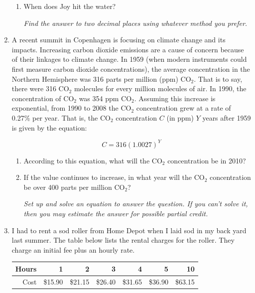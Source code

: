\documentclass[12pt]{article}
\begin{document}
\begin{enumerate}
\begin{enumerate}
\item When does Joy hit the water?

\emph{Find the answer to two decimal places using whatever method you prefer.}

\vfill
\end{enumerate}

\newpage %

\item A recent summit in Copenhagen is focusing on climate change and its impacts.  Increasing carbon dioxide emissions are a cause of concern because of their linkages to climate change.  In 1959 (when modern instruments could first measure carbon dioxide concentrations), the average concentration in the Northern Hemisphere was 316 parts per million (ppm) CO$_{2}$.  That is to say, there were 316 CO$_{2}$ molecules for every million molecules of air.  In 1990, the concentration of CO$_{2}$ was 354 ppm CO$_{2}$.  Assuming this increase is exponential, from 1990 to 2008 the CO$_{2}$ concentration grew at a rate of 0.27\% per year.  That is, the CO$_{2}$ concentration $C$ (in ppm) $Y$ years after 1959 is given by the equation:

$$C=316(1.0027)^Y$$

\begin{enumerate}
\item According to this equation, what will the CO$_{2}$ concentration be in 2010?
\vfill
\item If the value continues to increase, in what year will the CO$_{2}$ concentration be over 400 parts per million CO$_{2}$?

\emph{Set up and solve an equation to answer the question.  If you can't solve it, then you may estimate the answer for possible partial credit.}
\vfill
\vfill
\vfill
\end{enumerate}

\newpage %

\item I had to rent a sod roller from Home Depot when I laid sod in my back yard last summer.    The table below lists the rental charges for the roller.  They charge an initial fee plus an hourly rate.

\begin{center}
\begin{tabular} {|r|r|r|r|r|r|r|} \hline
Hours & 1 & 2 & 3 & 4 & 5 & 10 \\ \hline
Cost & \$15.90 & \$21.15 & \$26.40 & \$31.65 & \$36.90 & \$63.15 \\ \hline
\end{tabular}
\end{center}


\end{enumerate}
\end{document}
